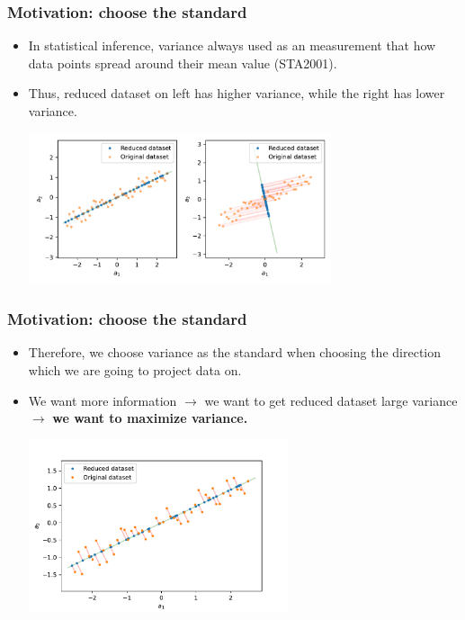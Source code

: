 \documentclass[serif]{beamer}
\begin{document}
\begin{frame}
    \frametitle{Motivation: choose the standard}
    \begin{itemize}
        \item In statistical inference, \alert{variance} always used as an measurement that how data points spread around their mean value (STA2001).
        \item Thus, reduced dataset on left has higher variance, while the right has lower variance.
        \begin{center}
            \includegraphics[width=3.5in]{./proj12.pdf}
        \end{center}
    \end{itemize}
\end{frame}

\begin{frame}
    \frametitle{Motivation: choose the standard}
    \begin{itemize}
        \item Therefore, we choose \alert{variance} as the standard when choosing the direction which we are going to project data on.
        \item We want more information $\rightarrow$ we want to get reduced dataset large variance $\rightarrow$ \textbf{we want to maximize variance.}
        \begin{center}
            \includegraphics[width=3in]{./proj1.pdf}
        \end{center}
    \end{itemize}
\end{frame}
\end{document}
